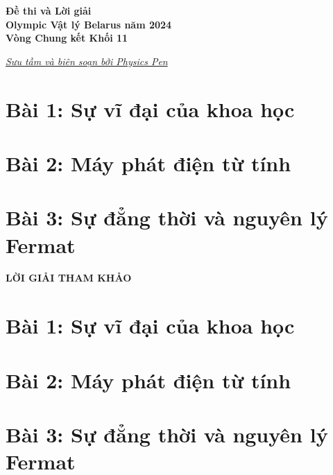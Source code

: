 \documentclass[12pt]{article}
\begin{document}
\thispagestyle{plain}

\begin{center}
  \LARGE{\textbf{Đề thi và Lời giải\\ Olympic Vật lý Belarus năm 2024\\Vòng Chung kết Khối 11}}
\end{center}
\begin{center}
  \large\textit{\href{https://facebook.com/physicspen1111}{Sưu tầm và biên soạn bởi Physics Pen}}
\end{center}

\vspace{1cm}

\section*{Bài 1: Sự vĩ đại của khoa học}


\section*{Bài 2: Máy phát điện từ tính}


\section*{Bài 3: Sự đẳng thời và nguyên lý Fermat}


\newpage

\begin{center}
  \Large{\textbf{LỜI GIẢI THAM KHẢO}}
\end{center}

\vspace{5mm}

\section*{Bài 1: Sự vĩ đại của khoa học}

\newpage

\section*{Bài 2: Máy phát điện từ tính}


\setcounter{equation}{0}
\section*{Bài 3: Sự đẳng thời và nguyên lý Fermat}

\end{document}
